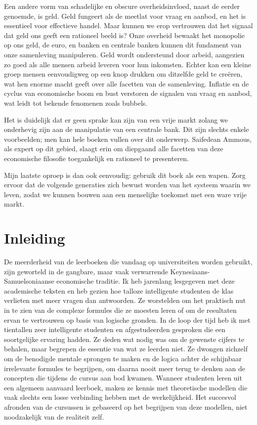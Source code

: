 Een andere vorm van schadelijke en obscure overheidsinvloed, naast de eerder genoemde, is geld. Geld fungeert als de meetlat voor vraag en aanbod, en het is essentieel voor effectieve handel. Maar kunnen we erop vertrouwen dat het signaal dat geld ons geeft een rationeel beeld is? Onze overheid bewaakt het monopolie op ons geld, de euro, en banken en centrale banken kunnen dit fundament van onze samenleving manipuleren. Geld wordt ondersteund door arbeid, aangezien zo goed als alle mensen arbeid leveren voor hun inkomsten. Echter kan een kleine groep mensen eenvoudigweg op een knop drukken om ditzelfde geld te creëren, wat hen enorme macht geeft over alle facetten van de samenleving. Inflatie en de cyclus van economische boom en bust verstoren de signalen van vraag en aanbod, wat leidt tot bekende fenomenen zoals bubbels.

Het is duidelijk dat er geen sprake kan zijn van een vrije markt zolang we onderhevig zijn aan de manipulatie van een centrale bank. Dit zijn slechts enkele voorbeelden; men kan hele boeken vullen over dit onderwerp. Saifedean Ammous, als expert op dit gebied, slaagt erin om diepgaand alle facetten van deze economische filosofie toegankelijk en rationeel te presenteren.

Mijn laatste oproep is dan ook eenvoudig: gebruik dit boek als een wapen. Zorg ervoor dat de volgende generaties zich bewust worden van het systeem waarin we leven, zodat we kunnen bouwen aan een menselijke toekomst met een ware vrije markt.


\chapter{Inleiding}
De meerderheid van de leerboeken die vandaag op universiteiten worden gebruikt, zijn geworteld in de gangbare, maar vaak verwarrende Keynesiaans-Samuel\-soniaanse economische traditie. Ik heb jarenlang lesgegeven met deze academische teksten en heb gezien hoe talloze intelligente studenten de klas verlieten met meer vragen dan antwoorden. Ze worstelden om het praktisch nut in te zien van de complexe formules die ze moesten leren of om de resultaten ervan te vertrouwen op basis van logische gronden. In de loop der tijd heb ik met tientallen zeer intelligente studenten en afgestudeerden gesproken die een soortgelijke ervaring hadden. Ze deden wat nodig was om de gewenste cijfers te behalen, maar begrepen de essentie van wat ze leerden niet. Ze dwongen zichzelf om de benodigde mentale sprongen te maken en de logica achter de schijnbaar irrelevante formules te begrijpen, om daarna nooit meer terug te denken aan de concepten die tijdens de cursus aan bod kwamen. Wanneer studenten leren uit een algemeen aanvaard leerboek, maken ze kennis met theoretische modellen die vaak slechts een losse verbinding hebben met de werkelijkheid. Het succesvol afronden van de cursussen is gebaseerd op het begrijpen van deze modellen, niet noodzakelijk van de realiteit zelf.


